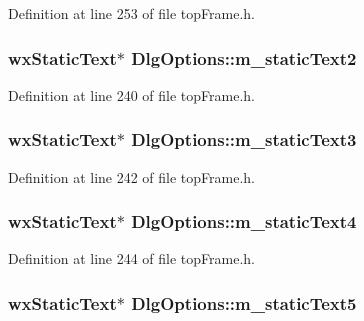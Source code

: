 Definition at line 253 of file top\-Frame.\-h.

\hypertarget{class_dlg_options_abdb2ecd5cdb67f4e0975b675c6d4b0c1}{
\subsubsection[{m\-\_\-static\-Text2}]{\setlength{\rightskip}{0pt plus 5cm}wx\-Static\-Text$\ast$ Dlg\-Options\-::m\-\_\-static\-Text2\hspace{0.3cm}{\ttfamily [protected]}}}\label{class_dlg_options_abdb2ecd5cdb67f4e0975b675c6d4b0c1}


Definition at line 240 of file top\-Frame.\-h.

\hypertarget{class_dlg_options_a4e8c47efc358292c877acc2582d91d96}{
\subsubsection[{m\-\_\-static\-Text3}]{\setlength{\rightskip}{0pt plus 5cm}wx\-Static\-Text$\ast$ Dlg\-Options\-::m\-\_\-static\-Text3\hspace{0.3cm}{\ttfamily [protected]}}}\label{class_dlg_options_a4e8c47efc358292c877acc2582d91d96}


Definition at line 242 of file top\-Frame.\-h.

\hypertarget{class_dlg_options_a82326f04c59e3bbeb706cba2653a1b18}{
\subsubsection[{m\-\_\-static\-Text4}]{\setlength{\rightskip}{0pt plus 5cm}wx\-Static\-Text$\ast$ Dlg\-Options\-::m\-\_\-static\-Text4\hspace{0.3cm}{\ttfamily [protected]}}}\label{class_dlg_options_a82326f04c59e3bbeb706cba2653a1b18}


Definition at line 244 of file top\-Frame.\-h.

\hypertarget{class_dlg_options_a8ad98bb2bd779da9e35984673fb79af9}{
\subsubsection[{m\-\_\-static\-Text5}]{\setlength{\rightskip}{0pt plus 5cm}wx\-Static\-Text$\ast$ Dlg\-Options\-::m\-\_\-static\-Text5\hspace{0.3cm}{\ttfamily [protected]}}}\label{class_dlg_options_a8ad98bb2bd779da9e35984673fb79af9}


